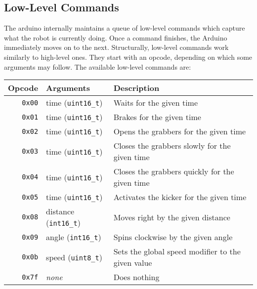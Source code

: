 \subsection{Low-Level Commands}

The arduino internally maintains a queue of low-level commands which capture what the robot is currently doing. Once a command finishes, the Arduino immediately moves on to the next. Structurally, low-level commands work similarly to high-level ones. They start with an opcode, depending on which some arguments may follow. The available low-level commands are:

\begin{table}[H]
\begin{tabularx}{\textwidth}{rlX}
    Opcode & Arguments & Description \\
    \hline
    \texttt{0x00} & time (\texttt{uint16\_t}) &
        Waits for the given time \\
    \texttt{0x01} & time (\texttt{uint16\_t}) &
        Brakes for the given time \\
    \texttt{0x02} & time (\texttt{uint16\_t}) &
        Opens the grabbers for the given time \\
    \texttt{0x03} & time (\texttt{uint16\_t}) &
        Closes the grabbers slowly for the given time \\
    \texttt{0x04} & time (\texttt{uint16\_t}) &
        Closes the grabbers quickly for the given time \\
    \texttt{0x05} & time (\texttt{uint16\_t}) &
        Activates the kicker for the given time \\
    \texttt{0x08} & distance (\texttt{int16\_t}) &
        Moves right by the given distance \\
    \texttt{0x09} & angle (\texttt{int16\_t}) &
        Spins clockwise by the given angle \\
    \texttt{0x0b} & speed (\texttt{uint8\_t}) &
        Sets the global speed modifier to the given value \\
    \texttt{0x7f} & \textit{none} & Does nothing \\
\end{tabularx}
\end{table}

